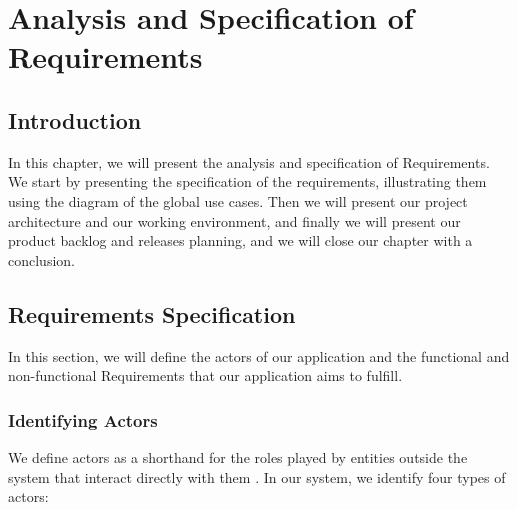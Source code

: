 \chapter{Analysis and Specification of Requirements}

\section*{Introduction}

In this chapter, we will present the analysis and specification of Requirements. We start by presenting the specification of the requirements, illustrating them using the diagram of the global use cases. Then we will present our project architecture and our working environment, and finally we will present our product backlog and releases planning, and we will close our chapter with a conclusion.

\section{Requirements Specification}

In this section, we will define the actors of our application and the functional and non-functional Requirements that our application aims to fulfill.

\subsection{Identifying Actors}

We define actors as a shorthand for the roles played by entities outside the system that interact directly with them \cite{CockburnUML2002, CockburnWritingEffectiveUseCases2000}. In our system, we identify four types of actors:

